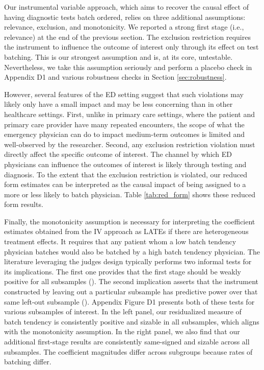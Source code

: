 \documentclass[,,nonblindrev]{informs}
\begin{document}
Our instrumental variable approach, which aims to recover the causal
effect of having diagnostic tests batch ordered, relies on three
additional assumptions: relevance, exclusion, and monotonicity. We
reported a strong first stage (i.e., relevance) at the end of the
previous section. The exclusion restriction requires the instrument to
influence the outcome of interest only through its effect on test
batching. This is our strongest assumption and is, at its core,
untestable. Nevertheless, we take this assumption seriously and perform
a placebo check in Appendix D1 and various robustness checks in Section
\ref{sec:robustness}.

However, several features of the ED setting suggest that such violations
may likely only have a small impact and may be less concerning than in
other healthcare settings. First, unlike in primary care settings, where
the patient and primary care provider have many repeated encounters, the
scope of what the emergency physician can do to impact medium-term
outcomes is limited and well-observed by the researcher. Second, any
exclusion restriction violation must directly affect the specific
outcome of interest. The channel by which ED physicians can influence
the outcomes of interest is likely through testing and diagnosis. To the
extent that the exclusion restriction is violated, our reduced form
estimates can be interpreted as the causal impact of being assigned to a
more or less likely to batch physician. Table \ref{tab:red_form} shows
these reduced form results.

Finally, the monotonicity assumption is necessary for interpreting the
coefficient estimates obtained from the IV approach as LATEs if there
are heterogeneous treatment effects. It requires that any patient whom a
low batch tendency physician batches would also be batched by a high
batch tendency physician. The literature leveraging the judges design
typically performs two informal tests for its implications. The first
one provides that the first stage should be weakly positive for all
subsamples (\citet{dobbie2018effects}). The second implication asserts
that the instrument constructed by leaving out a particular subsample
has predictive power over that same left-out subsample
(\citet{bhuller2020incarceration}). Appendix Figure D1 presents both of
these tests for various subsamples of interest. In the left panel, our
residualized measure of batch tendency is consistently positive and
sizable in all subsamples, which aligns with the monotonicity
assumption. In the right panel, we also find that our additional
first-stage results are consistently same-signed and sizable across all
subsamples. The coefficient magnitudes differ across subgroups because
rates of batching differ.
\end{document}
